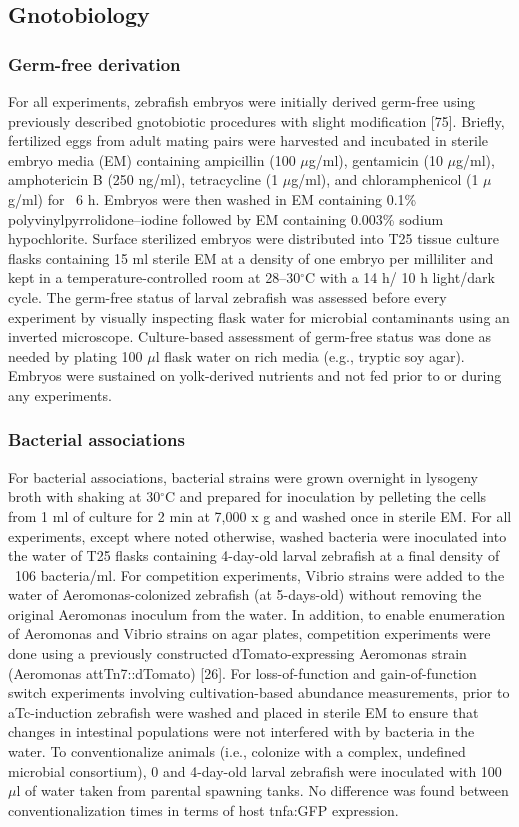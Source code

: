 \subsection{Gnotobiology}

\subsubsection{Germ-free derivation}
For all experiments, zebrafish embryos were initially derived germ-free using previously described gnotobiotic procedures with slight modification [75]. Briefly, fertilized eggs from adult mating pairs were harvested and incubated in sterile embryo media (EM) containing ampicillin (100 $\mu$g/ml), gentamicin (10 $\mu$g/ml), amphotericin B (250 ng/ml), tetracycline (1 $\mu$g/ml), and chloramphenicol (1 $\mu$g/ml) for ~6 h. Embryos were then washed in EM containing 0.1\% polyvinylpyrrolidone–iodine followed by EM containing 0.003\% sodium hypochlorite. Surface sterilized embryos were distributed into T25 tissue culture flasks containing 15 ml sterile EM at a density of one embryo per milliliter and kept in a temperature-controlled room at 28–30$^\circ$C with a 14 h/ 10 h light/dark cycle. The germ-free status of larval zebrafish was assessed before every experiment by visually inspecting flask water for microbial contaminants using an inverted microscope. Culture-based assessment of germ-free status was done as needed by plating 100 $\mu$l flask water on rich media (e.g., tryptic soy agar). Embryos were sustained on yolk-derived nutrients and not fed prior to or during any experiments. 

\subsubsection{Bacterial associations} 
For bacterial associations, bacterial strains were grown overnight in lysogeny broth with shaking at 30$^\circ$C and prepared for inoculation by pelleting the cells from 1 ml of culture for 2 min at 7,000 x g and washed once in sterile EM. For all experiments, except where noted otherwise, washed bacteria were inoculated into the water of T25 flasks containing 4-day-old larval zebrafish at a final density of ~106 bacteria/ml. For competition experiments, Vibrio strains were added to the water of Aeromonas-colonized zebrafish (at 5-days-old) without removing the original Aeromonas inoculum from the water. In addition, to enable enumeration of Aeromonas and Vibrio strains on agar plates, competition experiments were done using a previously constructed dTomato-expressing Aeromonas strain (Aeromonas attTn7::dTomato) [26]. For loss-of-function and gain-of-function switch experiments involving cultivation-based abundance measurements, prior to aTc-induction zebrafish were washed and placed in sterile EM to ensure that changes in intestinal populations were not interfered with by bacteria in the water. To conventionalize animals (i.e., colonize with a complex, undefined microbial consortium), 0 and 4-day-old larval zebrafish were inoculated with 100 $\mu$l of water taken from parental spawning tanks. No difference was found between conventionalization times in terms of host tnfa:GFP expression. 

